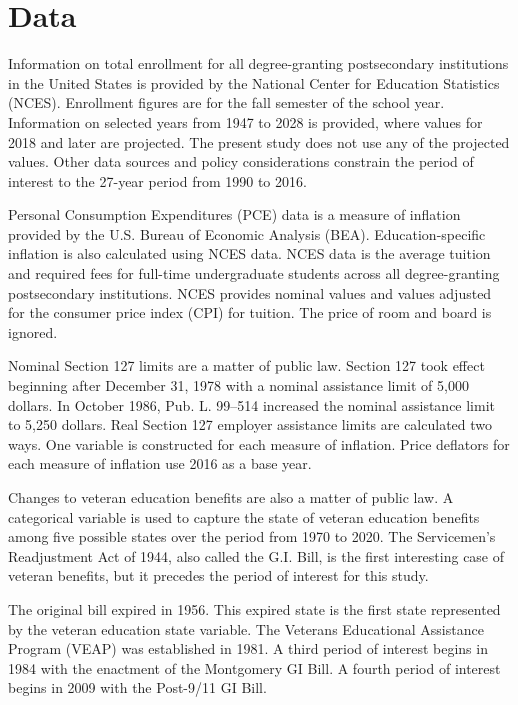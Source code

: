 \documentclass[review]{elsarticle}
\begin{document}
\section{Data}

Information on total enrollment for all degree-granting postsecondary institutions in the United States
is provided by the National Center for Education Statistics (NCES)\cite{nces_2019}.
Enrollment figures are for the fall semester of the school year.
Information on selected years from 1947 to 2028 is provided, where values for 2018 and later are projected.
The present study does not use any of the projected values.
Other data sources and policy considerations constrain the period of interest to the 27-year period from 1990 to 2016.

Personal Consumption Expenditures (PCE) data is a measure of inflation provided by the U.S. Bureau of Economic Analysis (BEA)\cite{bea_2020}.
Education-specific inflation is also calculated using NCES data\cite{nces_2017}.
NCES data is the average tuition and required fees for full-time undergraduate students across all degree-granting postsecondary institutions.
NCES provides nominal values and values adjusted for the consumer price index (CPI) for tuition.
The price of room and board is ignored.

Nominal Section 127 limits are a matter of public law.
Section 127 took effect beginning after December 31, 1978 with a nominal assistance limit of 5,000 dollars\cite{plaw95_600_1978}.
In October 1986, Pub. L. 99–514 increased the nominal assistance limit to 5,250 dollars\cite{plaw99_514_1986}.
Real Section 127 employer assistance limits are calculated two ways.
One variable is constructed for each measure of inflation.
Price deflators for each measure of inflation use 2016 as a base year.

Changes to veteran education benefits are also a matter of public law.
A categorical variable is used to capture the state of veteran education benefits among five possible states over the period from 1970 to 2020.
The Servicemen's Readjustment Act of 1944,
also called the G.I. Bill,
is the first interesting case of veteran benefits,
but it precedes the period of interest for this study.

The original bill expired in 1956\cite{glass_2010}.
This expired state is the first state represented by the veteran education state variable.
The Veterans Educational Assistance Program (VEAP) was established in 1981\cite{veteransaffairs_2017}.
A third period of interest begins in 1984 with the enactment of the Montgomery GI Bill\cite{powers_2018}.
A fourth period of interest begins in 2009 with the Post-9/11 GI Bill.
\end{document}
